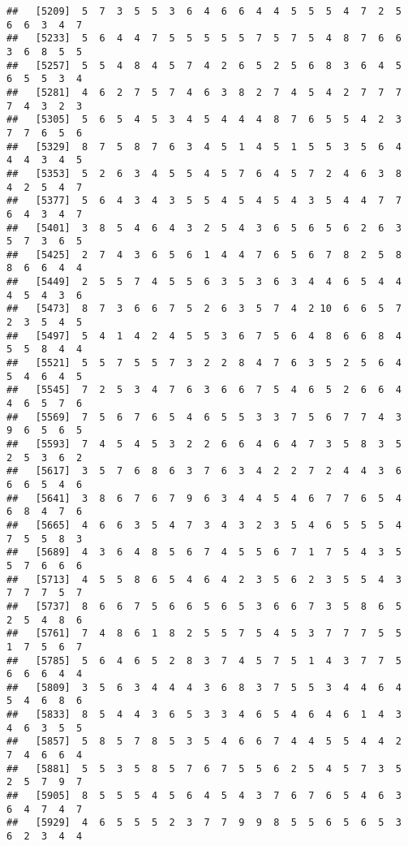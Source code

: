 \documentclass[
]{book}
\begin{document}
\begin{verbatim}
##   [5209]  5  7  3  5  5  3  6  4  6  6  4  4  5  5  5  4  7  2  5  6  6  3  4  7
##   [5233]  5  6  4  4  7  5  5  5  5  5  7  5  7  5  4  8  7  6  6  3  6  8  5  5
##   [5257]  5  5  4  8  4  5  7  4  2  6  5  2  5  6  8  3  6  4  5  6  5  5  3  4
##   [5281]  4  6  2  7  5  7  4  6  3  8  2  7  4  5  4  2  7  7  7  7  4  3  2  3
##   [5305]  5  6  5  4  5  3  4  5  4  4  4  8  7  6  5  5  4  2  3  7  7  6  5  6
##   [5329]  8  7  5  8  7  6  3  4  5  1  4  5  1  5  5  3  5  6  4  4  4  3  4  5
##   [5353]  5  2  6  3  4  5  5  4  5  7  6  4  5  7  2  4  6  3  8  4  2  5  4  7
##   [5377]  5  6  4  3  4  3  5  5  4  5  4  5  4  3  5  4  4  7  7  6  4  3  4  7
##   [5401]  3  8  5  4  6  4  3  2  5  4  3  6  5  6  5  6  2  6  3  5  7  3  6  5
##   [5425]  2  7  4  3  6  5  6  1  4  4  7  6  5  6  7  8  2  5  8  8  6  6  4  4
##   [5449]  2  5  5  7  4  5  5  6  3  5  3  6  3  4  4  6  5  4  4  4  5  4  3  6
##   [5473]  8  7  3  6  6  7  5  2  6  3  5  7  4  2 10  6  6  5  7  2  3  5  4  5
##   [5497]  5  4  1  4  2  4  5  5  3  6  7  5  6  4  8  6  6  8  4  5  5  8  4  4
##   [5521]  5  5  7  5  5  7  3  2  2  8  4  7  6  3  5  2  5  6  4  5  4  6  4  5
##   [5545]  7  2  5  3  4  7  6  3  6  6  7  5  4  6  5  2  6  6  4  4  6  5  7  6
##   [5569]  7  5  6  7  6  5  4  6  5  5  3  3  7  5  6  7  7  4  3  9  6  5  6  5
##   [5593]  7  4  5  4  5  3  2  2  6  6  4  6  4  7  3  5  8  3  5  2  5  3  6  2
##   [5617]  3  5  7  6  8  6  3  7  6  3  4  2  2  7  2  4  4  3  6  6  6  5  4  6
##   [5641]  3  8  6  7  6  7  9  6  3  4  4  5  4  6  7  7  6  5  4  6  8  4  7  6
##   [5665]  4  6  6  3  5  4  7  3  4  3  2  3  5  4  6  5  5  5  4  7  5  5  8  3
##   [5689]  4  3  6  4  8  5  6  7  4  5  5  6  7  1  7  5  4  3  5  5  7  6  6  6
##   [5713]  4  5  5  8  6  5  4  6  4  2  3  5  6  2  3  5  5  4  3  7  7  7  5  7
##   [5737]  8  6  6  7  5  6  6  5  6  5  3  6  6  7  3  5  8  6  5  2  5  4  8  6
##   [5761]  7  4  8  6  1  8  2  5  5  7  5  4  5  3  7  7  7  5  5  1  7  5  6  7
##   [5785]  5  6  4  6  5  2  8  3  7  4  5  7  5  1  4  3  7  7  5  6  6  6  4  4
##   [5809]  3  5  6  3  4  4  4  3  6  8  3  7  5  5  3  4  4  6  4  5  4  6  8  6
##   [5833]  8  5  4  4  3  6  5  3  3  4  6  5  4  6  4  6  1  4  3  4  6  3  5  5
##   [5857]  5  8  5  7  8  5  3  5  4  6  6  7  4  4  5  5  4  4  2  7  4  6  6  4
##   [5881]  5  5  3  5  8  5  7  6  7  5  5  6  2  5  4  5  7  3  5  2  5  7  9  7
##   [5905]  8  5  5  5  4  5  6  4  5  4  3  7  6  7  6  5  4  6  3  6  4  7  4  7
##   [5929]  4  6  5  5  5  2  3  7  7  9  9  8  5  5  6  5  6  5  3  6  2  3  4  4

\end{verbatim}
\end{document}

